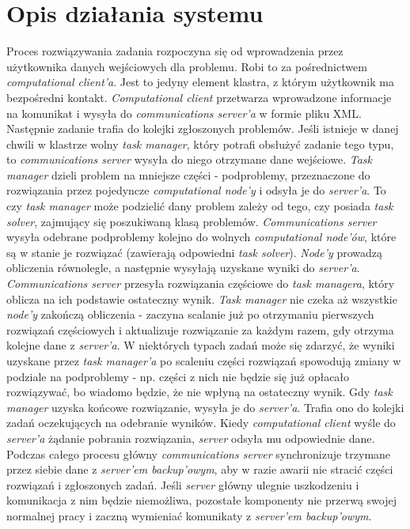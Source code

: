 \documentclass[12pt,a4paper,titlepage]{report}
\begin{document}
	\chapter{Opis działania systemu}
	Proces rozwiązywania zadania rozpoczyna się od wprowadzenia przez użytkownika danych wejściowych dla problemu. Robi to za pośrednictwem \emph{computational client'a}. Jest to jedyny element klastra, z którym użytkownik ma bezpośredni kontakt. \emph{Computational client} przetwarza wprowadzone informacje na komunikat i wysyła do \emph{communications server'a} w formie pliku XML. Następnie zadanie trafia do kolejki zgłoszonych problemów. Jeśli istnieje w danej chwili w klastrze wolny \emph{task manager}, który potrafi obsłużyć zadanie tego typu, to \emph{communications server} wysyła do niego otrzymane dane wejściowe. \emph{Task manager} dzieli problem na mniejsze części - podproblemy, przeznaczone do rozwiązania przez pojedyncze \emph{computational node'y} i odsyła je do \emph{server'a}. To czy \emph{task manager} może podzielić dany problem zależy od tego, czy posiada \emph{task solver}, zajmujący się poszukiwaną klasą problemów. \emph{Communications server} wysyła odebrane podproblemy kolejno do wolnych \emph{computational node'ów}, które są w stanie je rozwiązać (zawierają odpowiedni \emph{task solver}). \emph{Node'y} prowadzą obliczenia równolegle, a następnie wysyłają uzyskane wyniki do \emph{server'a}. \emph{Communications server} przesyła rozwiązania częściowe do \emph{task managera}, który oblicza na ich podstawie ostateczny wynik. \emph{Task manager} nie czeka aż wszystkie \emph{node'y} zakończą obliczenia - zaczyna scalanie już po otrzymaniu pierwszych rozwiązań częściowych i aktualizuje rozwiązanie za każdym razem, gdy otrzyma kolejne dane z \emph{server'a}. W niektórych typach zadań może się zdarzyć, że wyniki uzyskane przez \emph{task manager'a} po scaleniu części rozwiązań spowodują zmiany w podziale na podproblemy - np. części z nich nie będzie się już opłacało rozwiązywać, bo wiadomo będzie, że nie wpłyną na ostateczny wynik. Gdy \emph{task manager} uzyska końcowe rozwiązanie, wysyła je do \emph{server'a}. Trafia ono do kolejki zadań oczekujących na odebranie wyników. Kiedy \emph{computational client} wyśle do \emph{server'a} żądanie pobrania rozwiązania, \emph{server} odsyła mu odpowiednie dane.\\
Podczas całego procesu główny \emph{communications server} synchronizuje trzymane przez siebie dane z \emph{server'em backup'owym}, aby w razie awarii nie stracić części rozwiązań i zgłoszonych zadań. Jeśli \emph{server} główny ulegnie uszkodzeniu i komunikacja z nim będzie niemożliwa, pozostałe komponenty nie przerwą swojej normalnej pracy i zaczną wymieniać komunikaty z \emph{server'em backup'owym}.
\end{document}
